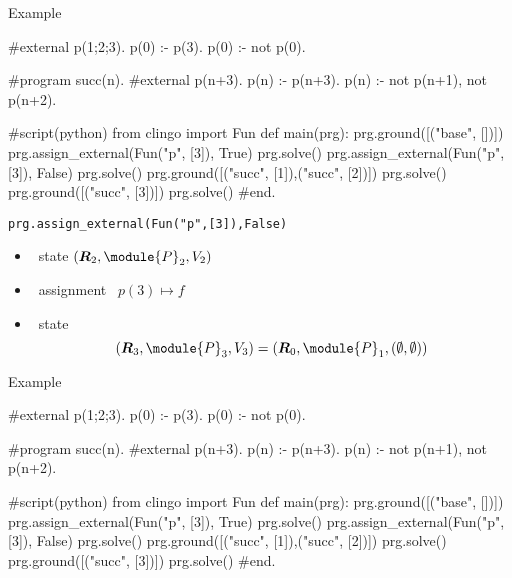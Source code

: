 \begin{frame}[fragile]{Example}
\scriptsize\vspace{-10pt}%
\begin{semiverbatim}
   #external p(1;2;3).
   p(0) :- p(3).
   p(0) :- not p(0).

   #program succ(n).
   #external p(n+3).
   p(n) :- p(n+3).
   p(n) :- not p(n+1), not p(n+2).

   #script(python)
   from clingo import Fun
   def main(prg):
       prg.ground([("base", [])])
       prg.assign_external(Fun("p", [3]), True)
\only<1>{\alert{>>}}\only<2>{  }     \alert<1>{prg.solve()}
     \alert<2>{prg.assign_external(Fun("p", [3]), False)}
       prg.solve()
       prg.ground([("succ", [1]),("succ", [2])])
       prg.solve()
       prg.ground([("succ", [3])])
       prg.solve()
   #end.
\end{semiverbatim}
\end{frame}
\begin{frame}{\texttt{prg.assign\_external(Fun("p",[3]),False)}}
  \begin{itemize}
  \item {} \clingo\ state $(\boldsymbol{\RRG}_2,\module{P}_2,V_2 )$
  \item {} \ assignment \ $p(3)\mapsto f$
    \medskip
  \item<2->  \clingo\ state
    \[
    (\boldsymbol{\RRG}_3,\module{P}_3,V_3 )
    =
    (\boldsymbol{\RRG}_0,\module{P}_1,(\emptyset,\emptyset))
    \]
  \end{itemize}
\end{frame}
\begin{frame}[fragile]{Example}
\scriptsize\vspace{-10pt}%
\begin{semiverbatim}
   #external p(1;2;3).
   p(0) :- p(3).
   p(0) :- not p(0).

   #program succ(n).
   #external p(n+3).
   p(n) :- p(n+3).
   p(n) :- not p(n+1), not p(n+2).

   #script(python)
   from clingo import Fun
   def main(prg):
       prg.ground([("base", [])])
       prg.assign_external(Fun("p", [3]), True)
       prg.solve()
     \alert<1>{prg.assign_external(Fun("p", [3]), False)}
     \alert<2>{prg.solve()}
       prg.ground([("succ", [1]),("succ", [2])])
       prg.solve()
       prg.ground([("succ", [3])])
       prg.solve()
   #end.
\end{semiverbatim}
\end{frame}
